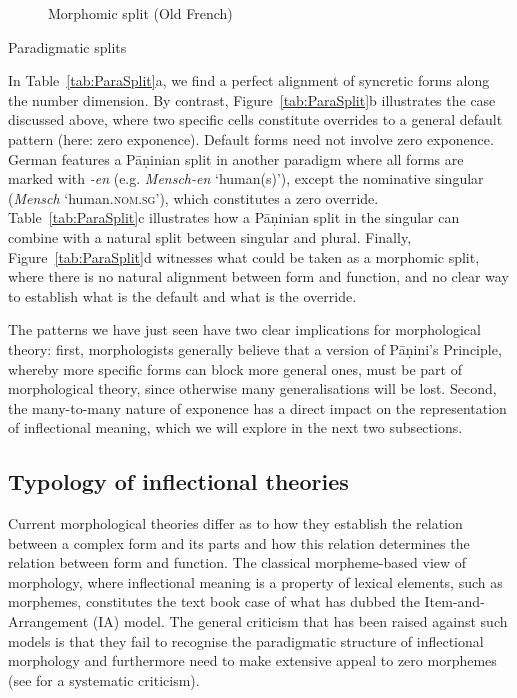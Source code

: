 \documentclass[output=paper
                ,modfonts
                ,nonflat
	        ,collection
	        ,collectionchapter
	        ,collectiontoclongg
 	        ,biblatex
                ,babelshorthands
                ,newtxmath
                ,draftmode
                ,colorlinks, citecolor=brown
] {langscibook}
\begin{document}
{\begin{table}[htb]
\begin{subfigure}{.45\textwidth}
    \caption{Morphomic split (Old French)}
  \end{subfigure}
  
  
  \caption{Paradigmatic splits}
  \label{tab:ParaSplit}
\end{table}

In Table~\ref{tab:ParaSplit}a, we find a perfect alignment of
syncretic forms along the number dimension. By contrast,
Figure~\ref{tab:ParaSplit}b illustrates the case discussed above,
where two specific cells constitute overrides to a general default
pattern (here: zero exponence). Default forms need not involve zero
exponence. German features a Pāṇinian split in another paradigm where
all forms are marked with \textit{-en} (e.g. \textit{Mensch-en}
`human(s)'), except the nominative singular (\textit{Mensch}
`human\textsc{.nom.sg}'), which constitutes a zero
override. Table~\ref{tab:ParaSplit}c illustrates how a Pāṇinian split
in the singular can combine with a natural split between singular and
plural. Finally, Figure~\ref{tab:ParaSplit}d witnesses what could be
taken as a morphomic split, where there is no natural alignment
between form and function, and no clear way to establish what is the
default and what is the override.

The patterns we have just seen have two clear implications for
morphological theory: first,  morphologists generally believe that
a version of Pāṇini's Principle, whereby more specific forms can block
more general ones, must be part of morphological theory, since
otherwise many generalisations will be lost. 
Second, the many-to-many nature of exponence has a direct impact on
the representation of inflectional meaning, which we will explore in
the next two subsections. 

\subsection{Typology of inflectional theories}
\label{sec:InflTypology}

Current morphological theories differ as to how they establish the
relation between a complex form and its parts and how this relation
determines the relation between form and function. The classical
morpheme-based view of morphology, where inflectional meaning is a
property of lexical elements, such as morphemes, constitutes the text
book case of what \cite{Hockett54} has dubbed the Item-and-Arrangement
(IA) model.  The general criticism that has been raised against such
models is that they fail to recognise the paradigmatic structure of
inflectional morphology and furthermore need to make extensive appeal
to zero morphemes (see \citealp{Anderson92} for a systematic
criticism).

}
\end{document}
